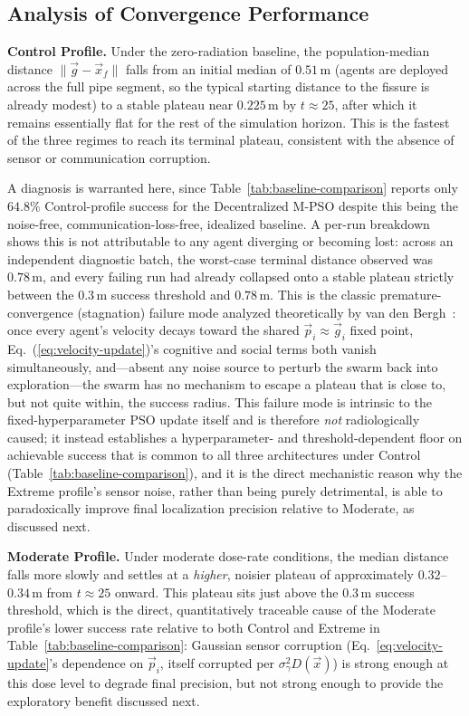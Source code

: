 \documentclass[journal]{IEEEtran}
\begin{document}
\subsection{Analysis of Convergence Performance}
\label{sec:convergence}

\textbf{Control Profile.} Under the zero-radiation baseline, the population-median distance $\|\vec{g}-\vec{x}_f\|$ falls from an initial median of $0.51\,\text{m}$ (agents are deployed across the full pipe segment, so the typical starting distance to the fissure is already modest) to a stable plateau near $0.225\,\text{m}$ by $t \approx 25$, after which it remains essentially flat for the rest of the simulation horizon. This is the fastest of the three regimes to reach its terminal plateau, consistent with the absence of sensor or communication corruption.

A diagnosis is warranted here, since Table~\ref{tab:baseline-comparison} reports only $64.8\%$ Control-profile success for the Decentralized M-PSO despite this being the noise-free, communication-loss-free, idealized baseline. A per-run breakdown shows this is not attributable to any agent diverging or becoming lost: across an independent diagnostic batch, the worst-case terminal distance observed was $0.78\,\text{m}$, and every failing run had already collapsed onto a stable plateau strictly between the $0.3\,\text{m}$ success threshold and $0.78\,\text{m}$. This is the classic premature-convergence (stagnation) failure mode analyzed theoretically by van den Bergh~\cite{van_den_bergh_2002}: once every agent's velocity decays toward the shared $\vec{p}_i \approx \vec{g}_i$ fixed point, Eq.~(\ref{eq:velocity-update})'s cognitive and social terms both vanish simultaneously, and---absent any noise source to perturb the swarm back into exploration---the swarm has no mechanism to escape a plateau that is close to, but not quite within, the success radius. This failure mode is intrinsic to the fixed-hyperparameter PSO update itself and is therefore \emph{not} radiologically caused; it instead establishes a hyperparameter- and threshold-dependent floor on achievable success that is common to all three architectures under Control (Table~\ref{tab:baseline-comparison}), and it is the direct mechanistic reason why the Extreme profile's sensor noise, rather than being purely detrimental, is able to paradoxically improve final localization precision relative to Moderate, as discussed next.

\textbf{Moderate Profile.} Under moderate dose-rate conditions, the median distance falls more slowly and settles at a \emph{higher}, noisier plateau of approximately $0.32$--$0.34\,\text{m}$ from $t \approx 25$ onward. This plateau sits just above the $0.3\,\text{m}$ success threshold, which is the direct, quantitatively traceable cause of the Moderate profile's lower success rate relative to both Control and Extreme in Table~\ref{tab:baseline-comparison}: Gaussian sensor corruption (Eq.~\ref{eq:velocity-update}'s dependence on $\vec{p}_i$, itself corrupted per $\sigma_\gamma^2 D(\vec{x})$) is strong enough at this dose level to degrade final precision, but not strong enough to provide the exploratory benefit discussed next.
\end{document}
